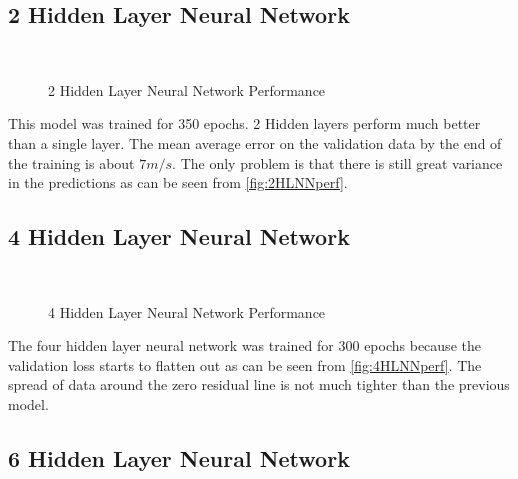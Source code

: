 \subsection{2 Hidden Layer Neural Network}
\label{hidden-layer-neural-network-1}
\begin{figure}[H]
  \centering
   \\
  \subfloat[Residulas]{}

  \caption{2 Hidden Layer Neural Network Performance}
  \label{fig:2HLNNperf}
\end{figure}

This model was trained for 350 epochs. 2 Hidden layers perform much better than a single layer. The mean average error on the validation data by the end of the training is about $7 m/s$. The only problem is that there is still great variance in the predictions as can be seen from \autoref{fig:2HLNNperf}.

\subsection{4 Hidden Layer Neural Network}
\label{hidden-layer-neural-network-2}

\begin{figure}[H]
  \centering
   \\
  \subfloat[Residulas]{}

  \caption{4 Hidden Layer Neural Network Performance}
  \label{fig:4HLNNperf}
\end{figure}

The four hidden layer neural network was trained for 300 epochs because the validation loss starts to flatten out as can be seen from \autoref{fig:4HLNNperf}. The spread of data around the zero residual line is not much tighter than the previous model.

\subsection{6 Hidden Layer Neural Network}
\label{hidden-layer-neural-network-3}

